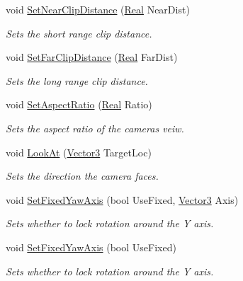 \begin{DoxyCompactItemize}
void \hyperlink{classphys_1_1Camera_aff7cb792640b250cafdfbc333de4bbeb}{SetNearClipDistance} (\hyperlink{namespacephys_af7eb897198d265b8e868f45240230d5f}{Real} NearDist)
\begin{DoxyCompactList}\small\item\em Sets the short range clip distance. \item\end{DoxyCompactList}\item 
void \hyperlink{classphys_1_1Camera_a25408db8110ac5035fafbd58a5b1106d}{SetFarClipDistance} (\hyperlink{namespacephys_af7eb897198d265b8e868f45240230d5f}{Real} FarDist)
\begin{DoxyCompactList}\small\item\em Sets the long range clip distance. \item\end{DoxyCompactList}\item 
void \hyperlink{classphys_1_1Camera_a6f895759e653eedb985217c621b265f6}{SetAspectRatio} (\hyperlink{namespacephys_af7eb897198d265b8e868f45240230d5f}{Real} Ratio)
\begin{DoxyCompactList}\small\item\em Sets the aspect ratio of the cameras veiw. \item\end{DoxyCompactList}\item 
void \hyperlink{classphys_1_1Camera_a6534be5001bf06ab4c4b32a084629842}{LookAt} (\hyperlink{classphys_1_1Vector3}{Vector3} TargetLoc)
\begin{DoxyCompactList}\small\item\em Sets the direction the camera faces. \item\end{DoxyCompactList}\item 
void \hyperlink{classphys_1_1Camera_a0fe097fbabbe1a88881f25bc827cabf5}{SetFixedYawAxis} (bool UseFixed, \hyperlink{classphys_1_1Vector3}{Vector3} Axis)
\begin{DoxyCompactList}\small\item\em Sets whether to lock rotation around the Y axis. \item\end{DoxyCompactList}\item 
void \hyperlink{classphys_1_1Camera_a1b4d5be85c528541c7a1cbebb41bfd89}{SetFixedYawAxis} (bool UseFixed)
\begin{DoxyCompactList}\small\item\em Sets whether to lock rotation around the Y axis. \item\end{DoxyCompactList}\item 

\end{DoxyCompactItemize}
